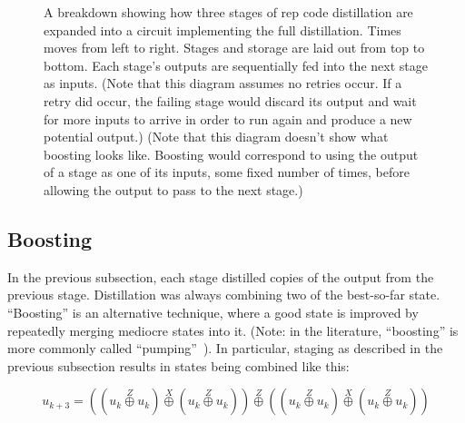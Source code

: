 \documentclass[onecolumn,unpublished,a4paper]{quantumarticle}
\theoremstyle{definition}
\theoremstyle{definition}
\theoremstyle{definition}
\begin{document}
\begin{figure}
    \centering
    \caption{
        A breakdown showing how three stages of rep code distillation are expanded into a circuit implementing the full distillation.
        Times moves from left to right.
        Stages and storage are laid out from top to bottom.
        Each stage's outputs are sequentially fed into the next stage as inputs.
        (Note that this diagram assumes no retries occur. If a retry did occur, the failing stage would discard its output and wait for more inputs to arrive in order to run again and produce a new potential output.)
        (Note that this diagram doesn't show what boosting looks like.
        Boosting would correspond to using the output of a stage as one of its inputs, some fixed number of times, before allowing the output to pass to the next stage.)
    }
    \label{fig:staging}
\end{figure}

\subsection{Boosting}

In the previous subsection, each stage distilled copies of the output from the previous stage.
Distillation was always combining two of the best-so-far state.
``Boosting'' is an alternative technique, where a good state is improved by repeatedly merging mediocre states into it.
(Note: in the literature, ``boosting'' is more commonly called ``pumping''~\cite{dr2003purification}).
In particular, staging as described in the previous subsection results in states being combined like this:

\begin{equation}
u_{k+3} = \left(\left(u_k \stackrel{Z}\oplus u_k\right) \stackrel{X}\oplus \left(u_k \stackrel{Z}\oplus u_k\right)\right) 
\stackrel{Z}\oplus
\left(\left(u_k \stackrel{Z}\oplus u_k\right) \stackrel{X}\oplus \left(u_k \stackrel{Z}\oplus u_k\right)\right)
\end{equation}
\end{document}
